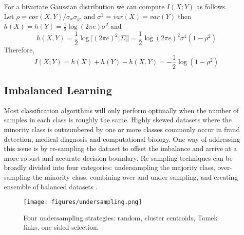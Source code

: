 For a bivariate Gaussian distribution we can compute $I(X;Y)$ as follows.\\
Let $\rho = cov(X,Y)/\sigma_x \sigma_y$, and $\sigma^2 = var(X) = var(Y)$ then $h(X) = h(Y) = \frac{1}{2}\log(2\pi e)\sigma^2$ and
\begin{equation}
    h(X,Y) = \frac{1}{2}\log\big[(2\pi e)^{2}|\Sigma|\big] = \frac{1}{2}\log(2\pi e)^{2}\sigma^4(1-\rho^2)
\end{equation}
Therefore,
\begin{equation}
    I(X;Y) = h(X) + h(Y) - h(X,Y) = -\frac{1}{2}\log (1- \rho^2)
\end{equation}


\subsection{Imbalanced Learning}

Most classification algorithms will only perform optimally when the number of samples in each class is roughly the same. Highly skewed datasets where the minority class is outnumbered by one or more classes commonly occur in fraud detection, medical diagnosis and computational biology. One way of addressing this issue is by re-sampling the dataset to offset the imbalance and arrive at a more robust and accurate decision boundary. Re-sampling techniques can be broadly divided into four categories: undersampling the majority class, over-sampling the minority class, combining over and under sampling, and creating ensemble of balanced datasets \cite{He2009}.\\

\begin{figure}[tbhp]
    \centering
    \texttt{[image: figures/undersampling.png]}
    \caption{Four undersampling strategies: random, cluster centroids, Tomek links, one-sided selection.}
    \label{fig:undersampling}
\end{figure}

